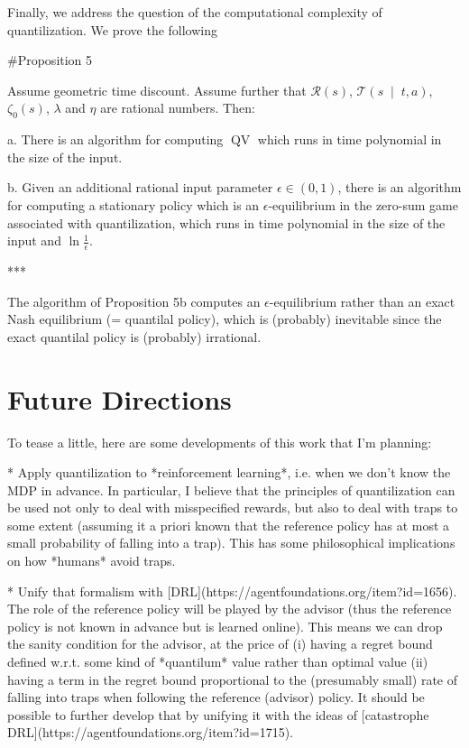 \documentclass[a4paper]{article}
\newcommand{\APM}[2]{\left(#1\;\middle\vert\;#2\right)}
\newcommand{\T}{\mathcal{T}}
\newcommand{\R}{\mathcal{R}}
\newcommand{\QV}{\operatorname{QV}}
\begin{document}
Finally, we address the question of the computational complexity of quantilization. We prove the following

\#Proposition 5

Assume geometric time discount. Assume further that $\R(s)$, $\T\APM{s}{t,a}$, $\zeta_0(s)$, $\lambda$ and $\eta$ are rational numbers. Then:

a. There is an algorithm for computing $\QV$ which runs in time polynomial in the size of the input.

b. Given an additional rational input parameter $\epsilon\in(0,1)$, there is an algorithm for computing a stationary policy which is an $\epsilon$-equilibrium in the zero-sum game associated with quantilization, which runs in time polynomial in the size of the input and $\ln\frac{1}{\epsilon}$.

***

The algorithm of Proposition 5b computes an $\epsilon$-equilibrium rather than an exact Nash equilibrium (= quantilal policy), which is (probably) inevitable since the exact quantilal policy is (probably) irrational.

\section{Future Directions}

To tease a little, here are some developments of this work that I'm planning:

* Apply quantilization to *reinforcement learning*, i.e. when we don't know the MDP in advance. In particular, I believe that the principles of quantilization can be used not only to deal with misspecified rewards, but also to deal with traps to some extent (assuming it a priori known that the reference policy has at most a small probability of falling into a trap). This has some philosophical implications on how *humans* avoid traps.

* Unify that formalism with [DRL](https://agentfoundations.org/item?id=1656). The role of the reference policy will be played by the advisor (thus the reference policy is not known in advance but is learned online). This means we can drop the sanity condition for the advisor, at the price of (i) having a regret bound defined w.r.t. some kind of *quantilum* value rather than optimal value (ii) having a term in the regret bound proportional to the (presumably small) rate of falling into traps when following the reference (advisor) policy. It should be possible to further develop that by unifying it with the ideas of [catastrophe DRL](https://agentfoundations.org/item?id=1715).
\end{document}
